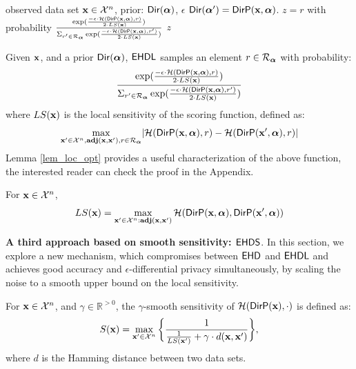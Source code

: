\documentclass{article}
\begin{document}
  \begin{algorithm}
  \caption{$\lexpmech$}
  \label{mech:lexpmech}
  \begin{algorithmic}
  \INPUT observed data set $\textbf{x} \in \mathcal{X}^n$, prior: $\mathsf{Dir}(\boldsymbol{\alpha})$, $\epsilon$
  \STATE {} $\mathsf{Dir}(\boldsymbol{\alpha}')= \mathsf{DirP}(\textbf{x},\boldsymbol{\alpha})$.
  \STATE {} $z=r$ with probability $\frac
  {\exp(\frac{-\epsilon\cdot \mathcal{H}(\mathsf{DirP}(\textbf{x},\boldsymbol{\alpha}), r)}{2\cdot LS(\textbf{x})})}
{\Sigma_{r' \in \mathcal{R}_{\boldsymbol{\alpha}}}\exp(\frac{-\epsilon\cdot \mathcal{H}(\mathsf{DirP}(\textbf{x},\boldsymbol{\alpha}), r')}{2\cdot LS(\textbf{x})})}$
 $z$
  \end{algorithmic}
  \end{algorithm}


Given $\textbf{x}$, and a prior $\mathsf{Dir}(\boldsymbol{\alpha})$, $\lexpmech$ samples an element $r \in \mathcal{R}_{\boldsymbol{\alpha}}$ with probability:
\[
 \frac
  {\exp(\frac{-\epsilon\cdot \mathcal{H}(\mathsf{DirP}(\textbf{x},\boldsymbol{\alpha}), r)}{2\cdot LS(\textbf{x})})}
{\Sigma_{r' \in \mathcal{R}_{\boldsymbol{\alpha}}}\exp(\frac{-\epsilon\cdot \mathcal{H}(\mathsf{DirP}(\textbf{x},\boldsymbol{\alpha}), r')}{2\cdot LS(\textbf{x})})}
\]
where $LS(\textbf{x})$ is the local sensitivity of the scoring function, defined as:
\begin{equation}\label{eq:local_sensitivity_scoring}
\max_{\textbf{x}'\in\mathcal{X}^n,\textbf{adj}(\textbf{x},\textbf{x}'), r\in \mathcal{R}_{\boldsymbol{\alpha}}}\lvert \mathcal{H}(\mathsf{DirP}(\textbf{x},\boldsymbol{\alpha}), r) - \mathcal{H}(\mathsf{DirP}(\textbf{x}',\boldsymbol{\alpha}), r)\rvert 
\end{equation}
Lemma \ref{lem_loc_opt}  provides a useful characterization of the above function, the interested reader can check the proof in the Appendix.
\begin{lem}
\label{lem_loc_opt}
For $\textbf{x}\in\mathcal{X}^n$, 
\[LS(\textbf{x}) = \max\limits_{\textbf{x}' \in \mathcal{X}^n:\textbf{adj}(\textbf{x},\textbf{x}')} \mathcal{H}(\mathsf{DirP}(\textbf{x},\boldsymbol{\alpha}), \mathsf{DirP}(\textbf{x}',\boldsymbol{\alpha}))\]
\end{lem}


\noindent \textbf{A third approach based on smooth sensitivity: $\mathsf{EHDS}$}. 
\label{sec_ehds}
In this section, we explore a new mechanism, which compromises between $\mathsf{EHD}$ and $\lexpmech$ and  achieves good accuracy and $\epsilon$-differential privacy simultaneously,
by scaling the noise to a smooth upper bound on the local sensitivity.
\begin{definition}
\label{def_gamma_smooth}
For $\textbf{x}\in\mathcal{X}^n$, and $\gamma \in \mathbb{R}^{> 0}$, the $\gamma$-smooth sensitivity of $\mathcal{H}(\mathsf{DirP}(\textbf{x}),\cdot)$ is defined as:
\begin{equation}
  \label{eq_smooth}
   S(\textbf{x})=\max_{\textbf{x}' \in \mathcal{X}^{n}}\bigg \{ \frac{1}{\frac{1}{LS(\textbf{x}')} +\gamma \cdot d(\textbf{x},\textbf{x}')} \bigg \},
\end{equation}
where $d$ is the Hamming distance between two data sets.
\end{definition}
\end{document}
